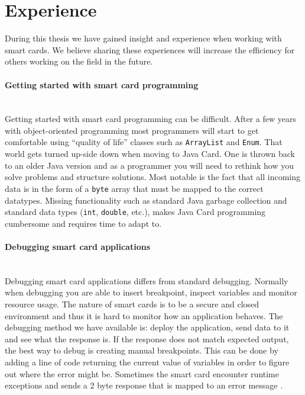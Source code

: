 \section{Experience}
During this thesis we have gained insight and experience when working with smart cards. We believe sharing these experiences will increase the efficiency for others working on the field in the future.

\paragraph{Getting started with smart card programming}\mbox{}\\
Getting started with smart card programming can be difficult. After a few years with object-oriented programming most programmers will start to get comfortable using ``quality of life'' classes such as \texttt{ArrayList} and \texttt{Enum}. That world gets turned up-side down when moving to Java Card. One is  thrown back to an older Java version and as a programmer you will need to rethink how you solve problems and structure solutions. Most notable is the fact that all incoming data is in the form of a \texttt{byte} array that must be mapped to the correct datatypes. Missing functionality such as standard Java garbage collection and standard data types (\texttt{int}, \texttt{double}, etc.), makes Java Card programming cumbersome and requires time to adapt to.

\paragraph{Debugging smart card applications}\mbox{}\\
Debugging smart card applications differs from standard debugging. Normally when debugging you are able to insert breakpoint, inspect variables and monitor resource usage. The nature of smart cards is to be a secure and closed environment and thus it is hard to monitor how an application behaves. The debugging method we have available is: deploy the application, send data to it and see what the response is. If the response does not match expected output, the best way to debug is creating manual breakpoints. This can be done by adding a line of code returning the current value of variables in order to figure out where the error might be. Sometimes the smart card encounter runtime exceptions and sends a 2 byte response that is mapped to an error message \cite{javacardErrors}.


